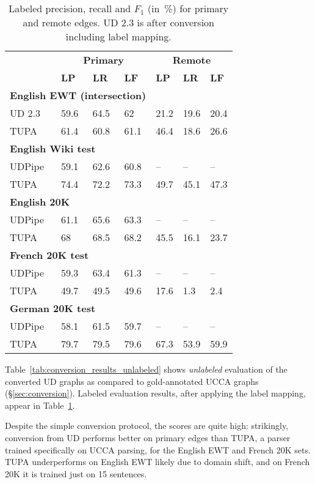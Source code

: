 \documentclass[11pt,a4paper]{article}
\begin{document}
\begin{table}[t]
\centering
\begin{tabular}{l|lll|lll}
& \multicolumn{3}{c|}{\footnotesize \bf Primary} & \multicolumn{3}{c}{\footnotesize \bf Remote} \\
& \footnotesize \textbf{LP} & \footnotesize \textbf{LR} & \footnotesize \textbf{LF}
& \footnotesize \textbf{LP} & \footnotesize \textbf{LR} & \footnotesize \textbf{LF} \\
\hline
\multicolumn{4}{l|}{\small \bf English EWT (intersection)} & \\
\footnotesize UD 2.3
& 59.6 & 64.5 & 62 & 21.2 & 19.6 & 20.4 \\
\footnotesize TUPA
& 61.4 & 60.8 & 61.1 & 46.4 & 18.6 & 26.6 \\
\multicolumn{4}{l|}{\small \bf English Wiki test} & \\
\footnotesize UDPipe
& 59.1 & 62.6 & 60.8 & -- & -- & -- \\
\footnotesize TUPA
& 74.4 & 72.2 & 73.3 & 49.7 & 45.1 & 47.3 \\
\multicolumn{4}{l|}{\small \bf English 20K} & \\
\footnotesize UDPipe
& 61.1 & 65.6 & 63.3 & -- & -- & -- \\
\footnotesize TUPA
& 68 & 68.5 & 68.2 & 45.5 & 16.1 & 23.7 \\
\multicolumn{4}{l|}{\small \bf French 20K test} & \\
\footnotesize UDPipe
& 59.3 & 63.4 & 61.3 & -- & -- & -- \\
\footnotesize TUPA
& 49.7 & 49.5 & 49.6 & 17.6 & 1.3 & 2.4 \\
\multicolumn{4}{l|}{\small \bf German 20K test} & \\
\footnotesize UDPipe
& 58.1 & 61.5 & 59.7 & -- & -- & -- \\
\footnotesize TUPA
& 79.7 & 79.5 & 79.6 & 67.3 & 53.9 & 59.9
\end{tabular}
\caption{
Labeled precision, recall and $F_1$ (in~\%) for primary and remote edges.
UD 2.3 is after conversion including label mapping.
\label{tab:conversion_results_labeled}}
\end{table}

Table~\ref{tab:conversion_results_unlabeled} shows \textit{unlabeled} evaluation of the
converted UD graphs as compared to gold-annotated UCCA graphs (\S\ref{sec:conversion}).
Labeled evaluation results, after applying the label mapping,
appear in Table~\ref{tab:conversion_results_labeled}.

Despite the simple conversion protocol, the scores are quite high:
strikingly, conversion from UD performs better on primary edges than
TUPA, a parser trained specifically on UCCA parsing,
for the English EWT and French 20K sets.
TUPA underperforms on English EWT likely due to domain shift,
and on French 20K it is trained just on 15 sentences.
\end{document}
